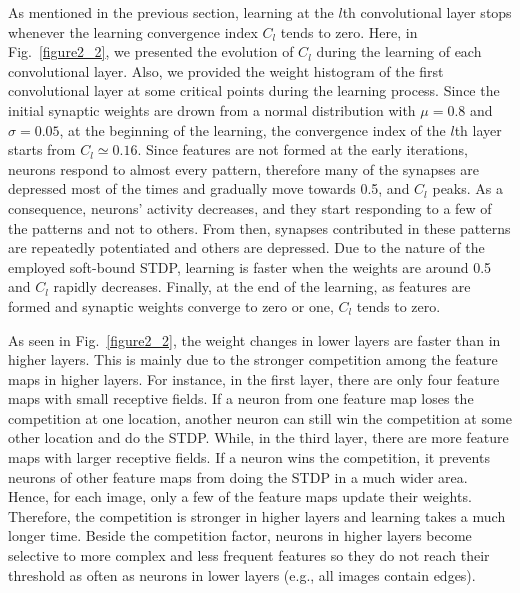 \documentclass[preprint,5p,12pt,twocolumn]{article}
\begin{document}
As mentioned in the previous section, learning at the $l$th convolutional layer stops whenever the learning convergence index $C_l$ tends to zero. Here, in Fig.~\ref{figure2_2}, we presented the evolution of $C_l$ during the learning of each convolutional layer. Also, we provided the weight histogram of the first convolutional layer at some critical points during the learning process. Since the initial synaptic weights are drown from a  normal distribution with $\mu=0.8$ and $\sigma=0.05$, at the beginning of the learning, the convergence index of the  $l$th layer starts from $C_l\simeq 0.16$. Since features are not formed at the early iterations, neurons respond to  almost every pattern, therefore many of the synapses are depressed most of the times and gradually move towards 0.5, and $C_l$ peaks. As a consequence, neurons' activity  decreases, and they start responding to a few of the patterns and not to others. From then, synapses contributed in these patterns are repeatedly potentiated and others are depressed. Due to the nature of the employed soft-bound STDP, learning is faster when the weights are around 0.5 and $C_l$ rapidly decreases. Finally, at the end of the learning, as features are formed and synaptic weights converge to zero or one, $C_l$ tends to zero.

As seen in  Fig.~\ref{figure2_2}, the weight changes in lower layers are faster than in higher layers. This is mainly due to the stronger competition among the feature maps in higher layers. For instance, in the first layer, there are only four feature maps with small receptive fields. If a neuron from one feature map loses the competition at one location, another neuron can still win the competition at some other location and do the STDP. While, in the third layer, there are more feature maps with larger receptive fields. If a neuron wins the competition, it prevents neurons of other feature maps from doing the STDP in a much wider area. Hence, for each image, only a few of the feature maps update their weights.  Therefore, the competition is stronger in higher layers and learning takes a much longer time. Beside the competition factor, neurons in higher layers become selective to more complex and less frequent features so they do not reach their threshold as often as  neurons  in lower layers (e.g., all images contain edges).
\end{document}
